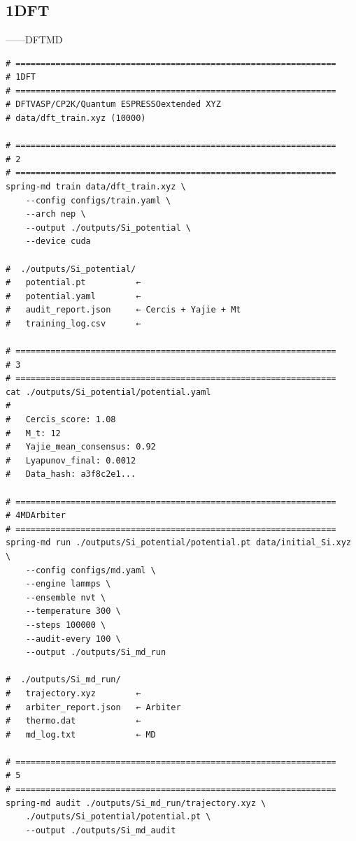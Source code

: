 \documentclass[12pt,a4paper]{article}
\theoremstyle{remark}
\begin{document}
\newpage

\section{}

\subsection{1DFT}

——DFTMD

\begin{lstlisting}[caption={},label=lst:workflow]
# ================================================================
# 1DFT
# ================================================================
# DFTVASP/CP2K/Quantum ESPRESSOextended XYZ
# data/dft_train.xyz (10000)

# ================================================================
# 2
# ================================================================
spring-md train data/dft_train.xyz \
    --config configs/train.yaml \
    --arch nep \
    --output ./outputs/Si_potential \
    --device cuda

#  ./outputs/Si_potential/ 
#   potential.pt          ← 
#   potential.yaml        ← 
#   audit_report.json     ← Cercis + Yajie + Mt
#   training_log.csv      ← 

# ================================================================
# 3
# ================================================================
cat ./outputs/Si_potential/potential.yaml
# 
#   Cercis_score: 1.08
#   M_t: 12
#   Yajie_mean_consensus: 0.92
#   Lyapunov_final: 0.0012
#   Data_hash: a3f8c2e1...

# ================================================================
# 4MDArbiter
# ================================================================
spring-md run ./outputs/Si_potential/potential.pt data/initial_Si.xyz \
    --config configs/md.yaml \
    --engine lammps \
    --ensemble nvt \
    --temperature 300 \
    --steps 100000 \
    --audit-every 100 \
    --output ./outputs/Si_md_run

#  ./outputs/Si_md_run/ 
#   trajectory.xyz        ← 
#   arbiter_report.json   ← Arbiter
#   thermo.dat            ← 
#   md_log.txt            ← MD

# ================================================================
# 5
# ================================================================
spring-md audit ./outputs/Si_md_run/trajectory.xyz \
    ./outputs/Si_potential/potential.pt \
    --output ./outputs/Si_md_audit


\end{lstlisting}
\end{document}

